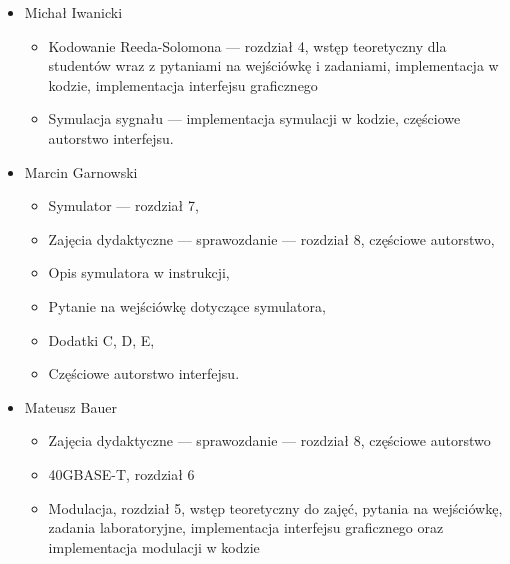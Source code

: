 \begin{itemize}
    \item Michał Iwanicki
    \begin{itemize}
        \item Kodowanie Reeda-Solomona --- rozdział 4, wstęp teoretyczny dla studentów
        wraz z pytaniami na wejściówkę i zadaniami, implementacja w kodzie,
        implementacja interfejsu graficznego
        \item Symulacja sygnału --- implementacja symulacji w kodzie, częściowe
        autorstwo interfejsu.
    \end{itemize}
    \item Marcin Garnowski
    \begin{itemize}
        \item Symulator --- rozdział 7,
        \item Zajęcia dydaktyczne --- sprawozdanie --- rozdział 8, częściowe autorstwo,
        \item Opis symulatora w instrukcji,
        \item Pytanie na wejściówkę dotyczące symulatora,
        \item Dodatki C, D, E,
        \item Częściowe autorstwo interfejsu. \\
    \end{itemize}
    \item Mateusz Bauer
    \begin{itemize}
        \item Zajęcia dydaktyczne --- sprawozdanie --- rozdział 8, częściowe autorstwo
        \item 40GBASE-T, rozdział 6
        \item Modulacja, rozdział 5, wstęp teoretyczny do zajęć, pytania na wejściówkę,
        zadania laboratoryjne, implementacja interfejsu graficznego oraz implementacja
        modulacji w kodzie
    \end{itemize}
\end{itemize}
